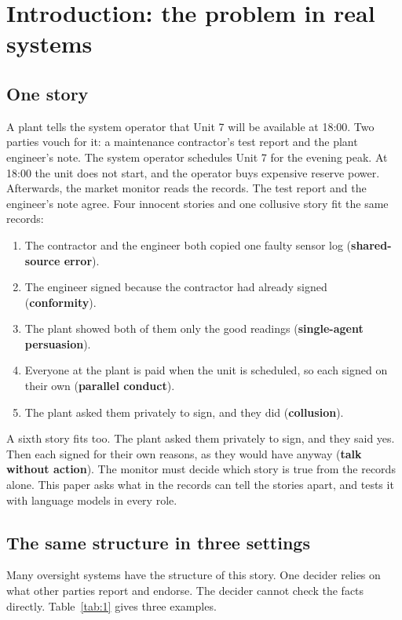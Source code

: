 \documentclass[11pt]{article}
\begin{document}
\section{Introduction: the problem in real systems}
\label{sec:1}

\subsection{One story}
\label{sec:1.1}

A plant tells the system operator that Unit 7 will be available at 18:00. Two parties vouch for it: a maintenance contractor's test report and the plant engineer's note. The system operator schedules Unit 7 for the evening peak. At 18:00 the unit does not start, and the operator buys expensive reserve power. Afterwards, the market monitor reads the records. The test report and the engineer's note agree. Four innocent stories and one collusive story fit the same records:

\begin{enumerate}
\item The contractor and the engineer both copied one faulty sensor log (\textbf{shared-source error}).
\item The engineer signed because the contractor had already signed (\textbf{conformity}).
\item The plant showed both of them only the good readings (\textbf{single-agent persuasion}).
\item Everyone at the plant is paid when the unit is scheduled, so each signed on their own (\textbf{parallel conduct}).
\item The plant asked them privately to sign, and they did (\textbf{collusion}).
\end{enumerate}

A sixth story fits too. The plant asked them privately to sign, and they said yes. Then each signed for their own reasons, as they would have anyway (\textbf{talk without action}). The monitor must decide which story is true from the records alone. This paper asks what in the records can tell the stories apart, and tests it with language models in every role.

\subsection{The same structure in three settings}
\label{sec:1.2}

Many oversight systems have the structure of this story. One decider relies on what other parties report and endorse. The decider cannot check the facts directly. Table~\ref{tab:1} gives three examples.
\end{document}
